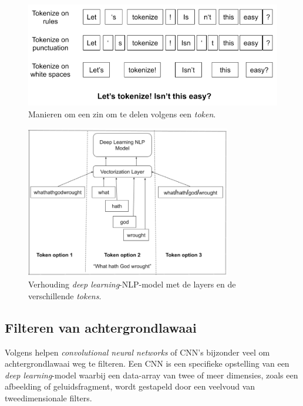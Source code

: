 \begin{figure}
    \centering
    \includegraphics[width=1\textwidth]{./img/tokenize_manier}
    \caption{\label{fig:tokens} Manieren om een zin om te delen volgens een \textit{token}.~\autocite{Horan2020}}
\end{figure}

\begin{figure}
    \centering
    \includegraphics[width=0.8\textwidth]{./img/tokenization-1}
    \caption{\label{fig:tokens_verhouding_dl}Verhouding \textit{deep learning}-NLP-model met de layers en de verschillende \textit{tokens}.~\autocite{Horan2020}}
\end{figure}


\subsection{Filteren van achtergrondlawaai}
Volgens \textcite{Jung2021} helpen \textit{convolutional neural networks} of CNN's bijzonder veel om achtergrondlawaai weg te filteren. Een CNN is een specifieke opstelling van een \textit{deep learning}-model waarbij een
data-array van twee of meer dimensies, zoals een afbeelding of geluidsfragment, wordt gestapeld door een veelvoud van tweedimensionale filters.

